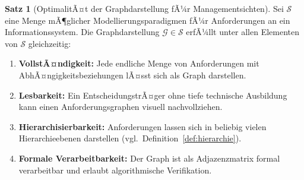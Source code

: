 ﻿\documentclass[a4paper,12pt]{report}
\theoremstyle{definition}
\newtheorem{satz}{Satz}[section]
\begin{document}
\begin{satz}[OptimalitÃ¤t der Graphdarstellung fÃ¼r Managementsichten]
\label{satz:graphoptimal}
Sei $\mathcal{S}$ eine Menge mÃ¶glicher Modellierungsparadigmen fÃ¼r Anforderungen an ein
Informationssystem. Die Graphdarstellung
$\mathcal{G} \in \mathcal{S}$ erfÃ¼llt unter allen Elementen von $\mathcal{S}$ gleichzeitig:
\begin{enumerate}
  \item \textbf{VollstÃ¤ndigkeit:} Jede endliche Menge von Anforderungen mit
        AbhÃ¤ngigkeitsbeziehungen lÃ¤sst sich als Graph darstellen.
  \item \textbf{Lesbarkeit:} Ein EntscheidungstrÃ¤ger ohne tiefe technische Ausbildung kann
        einen Anforderungsgraphen visuell nachvollziehen.
  \item \textbf{Hierarchisierbarkeit:} Anforderungen lassen sich in beliebig vielen
        Hierarchieebenen darstellen (vgl.\ Definition~\ref{def:hierarchie}).
  \item \textbf{Formale Verarbeitbarkeit:} Der Graph ist als Adjazenzmatrix formal
        verarbeitbar und erlaubt algorithmische Verifikation.
\end{enumerate}
\end{satz}
\end{document}
